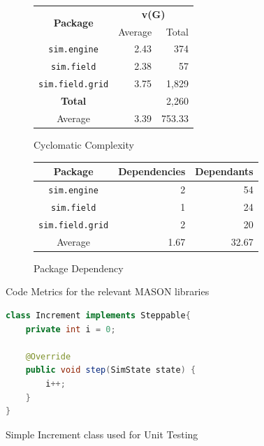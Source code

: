 \documentclass[11pt]{article}
\begin{document}
\begin{figure}[htp]
\begin{subfigure}[b]{0.5\textwidth}
\begin{center}
\begin{tabular}{|c|r|r|}
	\hline
	\multirow{2}{4em}{\textbf{Package}} & \multicolumn{2}{|c|}{\textbf{v(G)}} \\
	\cline{2-3}
	& Average & Total \\
	\hline
	\texttt{sim.engine} & 2.43 & 374 \\
	\texttt{sim.field} & 2.38 & 57 \\
	\texttt{sim.field.grid} & 3.75 & 1,829 \\
	\hline
	\textbf{Total} && 2,260 \\
	\hline
	Average & 3.39 & 753.33 \\
	\hline
\end{tabular}
\end{center}
\caption{Cyclomatic Complexity}
\label{table:cc}
\end{subfigure}
\begin{subfigure}[b]{0.5\textwidth}
\begin{center}
\begin{tabular}{|c|r|r|}
	\hline
	\textbf{Package} & \textbf{Dependencies} & \textbf{Dependants} \\
	\hline
	\texttt{sim.engine} & 2 & 54 \\
	\texttt{sim.field} & 1 & 24 \\
	\texttt{sim.field.grid} & 2 & 20 \\
	\hline
	Average & 1.67 & 32.67 \\
	\hline
\end{tabular}
\end{center}
\caption{Package Dependency}
\label{table:dependency}
\end{subfigure}

\caption{Code Metrics for the relevant MASON libraries}
\label{tables:metrics}
\end{figure}

\begin{figure}[htp]
\begin{lstlisting}[language=Java]
class Increment implements Steppable{
	private int i = 0;

	@Override
	public void step(SimState state) {
		i++;
	}
}
\end{lstlisting}

\caption{Simple Increment class used for Unit Testing}
\label{code:increment}
\end{figure}
\end{document}
